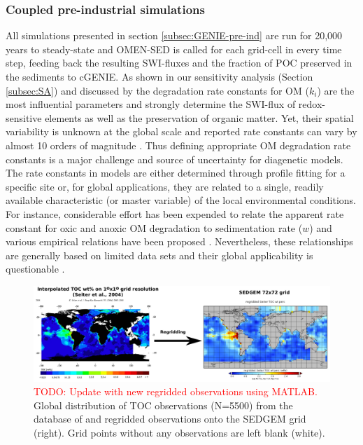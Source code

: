 \documentclass[gmd, manuscript]{copernicus}
\begin{document}
\subsubsection{Coupled pre-industrial simulations}\label{subsubsec:Methods_pre-ind_ESM_simul}
All simulations presented in section \ref{subsec:GENIE-pre-ind} are run for 20,000 years to steady-state and OMEN-SED is called for each grid-cell in every time step, feeding back the resulting SWI-fluxes and the 
fraction of POC preserved in the sediments to cGENIE. As shown in our sensitivity analysis (Section \ref{subsec:SA}) and discussed by \citet{arndt_quantifying_2013} the 
degradation rate constants for OM ($k_i$) are the most influential parameters and strongly determine the SWI-flux of redox-sensitive elements as well as the preservation of organic matter. 
Yet, their spatial variability is unknown at the global scale and reported rate constants can vary by almost 10 orders of magnitude \citep{arndt_quantifying_2013}. 
Thus defining appropriate OM degradation rate constants is a major challenge and source of uncertainty for diagenetic models. The rate constants in models are either determined through profile fitting for a specific site or, 
for global applications, they are related to a single, readily available characteristic (or master variable) of the local environmental conditions. 
For instance, considerable effort has been expended to relate the apparent rate constant for oxic and 
anoxic OM degradation to sedimentation rate ($w$) and various empirical relations have been proposed \citep{toth_organic_1977, tromp_global_1995, boudreau1997diagenetic, stolpovsky_toward_2015}. 
Nevertheless, these relationships are generally based on limited data sets and their global applicability is questionable \citep{arndt_quantifying_2013}. 

\begin{figure}[htbp]
\begin{center}
	\includegraphics[width=1.0\textwidth]{figures/OMEN-GENIE-Exp/Seiter_etal_2004_regridded.pdf}
	\caption{\textcolor{red}{TODO: Update with new regridded observations using MATLAB.} Global distribution of TOC observations (N=5500) from the database of \citet[][left]{seiter_organic_2004} 
	and regridded observations onto the SEDGEM grid (right). Grid points without any observations are left blank (white).}\label{fig:TOC_Obs_regridded}
\end{center}
\end{figure}
\end{document}
